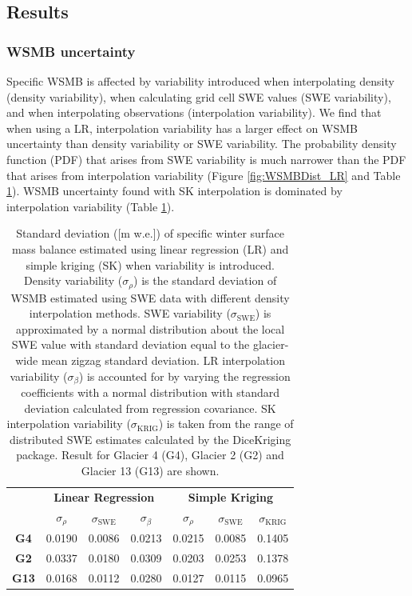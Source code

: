 \documentclass[12pt]{article}
\begin{document}
\subsection{Results}

\subsubsection{WSMB uncertainty}

Specific WSMB is affected by variability introduced when interpolating density (density variability), when calculating grid cell SWE values (SWE variability), and when interpolating observations (interpolation variability). We find that when using a LR, interpolation variability has a larger effect on WSMB uncertainty than density variability or SWE variability. The probability density function (PDF) that arises from SWE variability is much narrower than the PDF that arises from interpolation variability (Figure \ref{fig:WSMBDist_LR} and Table \ref{tab:WSMBdistribution_sigma}). WSMB uncertainty found with SK interpolation is dominated by interpolation variability (Table \ref{tab:WSMBdistribution_sigma}).  

 \begin{table}[]
\centering
\caption{Standard deviation ([m w.e.]) of specific winter surface mass balance estimated using linear regression (LR) and simple kriging (SK) when variability is introduced. Density variability ($\sigma_{\rho}$) is the standard deviation of WSMB estimated using SWE data with different density interpolation methods. SWE variability ($\sigma_{\mathrm{SWE}}$) is approximated by a normal distribution about the local SWE value with standard deviation equal to the glacier-wide mean zigzag standard deviation. LR interpolation variability ($\sigma_{\beta}$) is accounted for by varying the regression coefficients with a normal distribution with standard deviation calculated from regression covariance. SK interpolation variability ($\sigma_{\mathrm{KRIG}}$) is taken from the range of distributed SWE estimates calculated by the DiceKriging package. Result for Glacier 4 (G4), Glacier 2 (G2) and Glacier 13 (G13) are shown.}
\label{tab:WSMBdistribution_sigma}
\begin{tabular}{ccccccc}
\textbf{} & \multicolumn{3}{c}{\textbf{Linear Regression}} & \multicolumn{3}{c}{\textbf{Simple Kriging}} \\
 & $\sigma_{\rho}$ & $\sigma_{\mathrm{SWE}}$ & $\sigma_{\beta}$ & $\sigma_{\rho}$ & $\sigma_{\mathrm{SWE}}$ & $\sigma_{\mathrm{KRIG}}$ \\
\midrule
\textbf{G4} & 0.0190 & 0.0086 & 0.0213 & 0.0215 & 0.0085 & 0.1405 \\
\textbf{G2} & 0.0337 & 0.0180 & 0.0309 & 0.0203 & 0.0253 & 0.1378 \\
\textbf{G13} & 0.0168 & 0.0112 & 0.0280 & 0.0127 & 0.0115 & 0.0965
\end{tabular}
\end{table}
\end{document}
